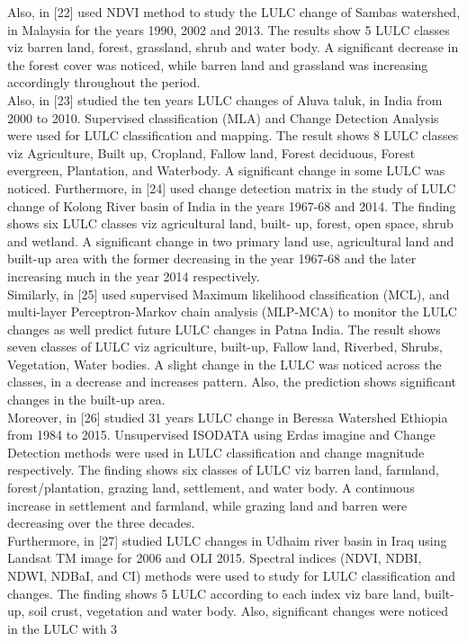 \documentclass[12pt,a4paper]{article}
\begin{document}
	Also, in [22] used NDVI method to study the LULC change of	Sambas watershed, in Malaysia for the years 1990, 2002 and 2013.	The results show 5 LULC classes viz barren land, forest, grassland,	shrub and water body. A significant decrease in the forest cover was noticed, while barren land and grassland was increasing accordingly throughout the period.\\
	
	Also, in [23] studied the ten years LULC changes of Aluva taluk, in India from 2000 to 2010. Supervised classification (MLA) and	Change Detection Analysis were used for LULC classification and	mapping. The result shows 8 LULC classes viz Agriculture, Built	up, Cropland, Fallow land, Forest deciduous, Forest evergreen,	Plantation, and Waterbody. A significant change in some LULC	was noticed.	Furthermore, in [24] used change detection matrix in the study of
	LULC change of Kolong River basin of India in the years 1967-68 and 2014. The finding shows six LULC classes viz agricultural	land, built- up, forest, open space, shrub and wetland. A significant change in two primary land use, agricultural land and built-up	area with the former decreasing in the year 1967-68 and the later
	increasing much in the year 2014 respectively.\\
	
	Similarly, in [25] used supervised Maximum likelihood classification (MCL), and multi-layer Perceptron-Markov chain analysis	(MLP-MCA) to monitor the LULC changes as well predict future	LULC changes in Patna India. The result shows seven classes of	LULC viz agriculture, built-up, Fallow land, Riverbed, Shrubs,	Vegetation, Water bodies. A slight change in the LULC was noticed across the classes, in a decrease and increases pattern. Also,	the prediction shows significant changes in the built-up area.\\
	Moreover, in [26] studied 31 years LULC change in Beressa Watershed Ethiopia from 1984 to 2015. Unsupervised ISODATA
	using Erdas imagine and Change Detection methods were used in
	LULC classification and change magnitude respectively. The finding shows six classes of LULC viz barren land, farmland, forest/plantation, grazing land, settlement, and water body. A continuous increase in settlement and farmland, while grazing land and	barren were decreasing over the three decades.\\
	
	Furthermore, in [27] studied LULC changes in Udhaim river basin	in Iraq using Landsat TM image for 2006 and OLI 2015. Spectral	indices (NDVI, NDBI, NDWI, NDBaI, and CI) methods were	used to study for LULC classification and changes. The finding	shows 5 LULC according to each index viz bare land, built-up,	soil crust, vegetation and water body. Also, significant changes	were noticed in the LULC with 3%
	
\end{document}
